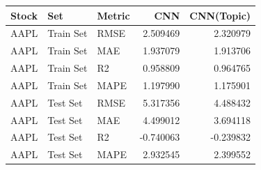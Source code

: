 \begin{tabular}{lllrr}
\toprule
Stock & Set & Metric & CNN & CNN(Topic) \\
\midrule
AAPL & Train Set & RMSE & 2.509469 & 2.320979 \\
AAPL & Train Set & MAE & 1.937079 & 1.913706 \\
AAPL & Train Set & R2 & 0.958809 & 0.964765 \\
AAPL & Train Set & MAPE & 1.197990 & 1.175901 \\
AAPL & Test Set & RMSE & 5.317356 & 4.488432 \\
AAPL & Test Set & MAE & 4.499012 & 3.694118 \\
AAPL & Test Set & R2 & -0.740063 & -0.239832 \\
AAPL & Test Set & MAPE & 2.932545 & 2.399552 \\
\bottomrule
\end{tabular}
